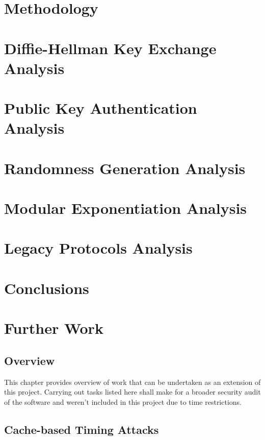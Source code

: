 \documentclass{report}
\begin{document}
\chapter{Methodology}
\chapter{Diffie-Hellman Key Exchange Analysis}
\chapter{Public Key Authentication Analysis}
\chapter{Randomness Generation Analysis}
\chapter{Modular Exponentiation Analysis}
\chapter{Legacy Protocols Analysis}
\chapter{Conclusions}
\chapter{Further Work}
\section{Overview}
This chapter provides overview of work that can be undertaken as an extension of this project. Carrying out tasks listed here shall make for a broader security audit of the software and weren't included in this project due to time restrictions.
\section{Cache-based Timing Attacks}
\end{document}
